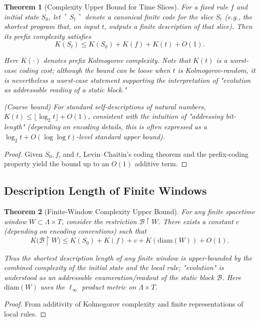 \documentclass[12pt]{article}
\theoremstyle{plain}
\newtheorem{theorem}{Theorem}[section]
\theoremstyle{definition}
\begin{document}
\begin{theorem}[Complexity Upper Bound for Time Slices]
For a fixed rule $f$ and initial state $S_0$, let $\ulcorner S_t\urcorner$ denote a canonical finite code for the slice $S_t$ (e.g., the shortest program that, on input $t$, outputs a finite description of that slice). Then its prefix complexity satisfies
\[
K(S_t) \le K(S_0)+K(f)+K(t)+O(1).
\]

Here $K(\cdot)$ denotes prefix Kolmogorov complexity. Note that $K(t)$ is a worst-case coding cost; although the bound can be loose when $t$ is Kolmogorov-random, it is nevertheless a worst-case statement supporting the interpretation of "evolution as addressable reading of a static block."

(Coarse bound) For standard self-descriptions of natural numbers, $K(t)\le\lfloor\log_2 t\rfloor+O(1)$, consistent with the intuition of "addressing bit-length" (depending on encoding details, this is often expressed as a $\log_2 t + O(\log\log t)$-level standard upper bound).
\end{theorem}

\begin{proof}
Given $S_0,f$, and $t$, Levin--Chaitin's coding theorem\cite{li2008} and the prefix-coding property yield the bound up to an $O(1)$ additive term.
\end{proof}

\subsection{Description Length of Finite Windows}

\begin{theorem}[Finite-Window Complexity Upper Bound]
For any finite spacetime window $W\subset \Lambda\times T$, consider the restriction $\mathcal{B}\upharpoonright W$. There exists a constant $c$ (depending on encoding conventions) such that
\[
K\big(\mathcal{B}\upharpoonright W\big) \le K(S_0)+K(f)+c+K(\mathrm{diam}(W))+O(1).
\]

Thus the shortest description length of any finite window is upper-bounded by the combined complexity of the initial state and the local rule; "evolution" is understood as an addressable enumeration/readout of the static block $\mathcal{B}$. Here $\mathrm{diam}(W)$ uses the $\ell_\infty$ product metric on $\Lambda\times T$.
\end{theorem}

\begin{proof}
From additivity of Kolmogorov complexity and finite representations of local rules.
\end{proof}
\end{document}
